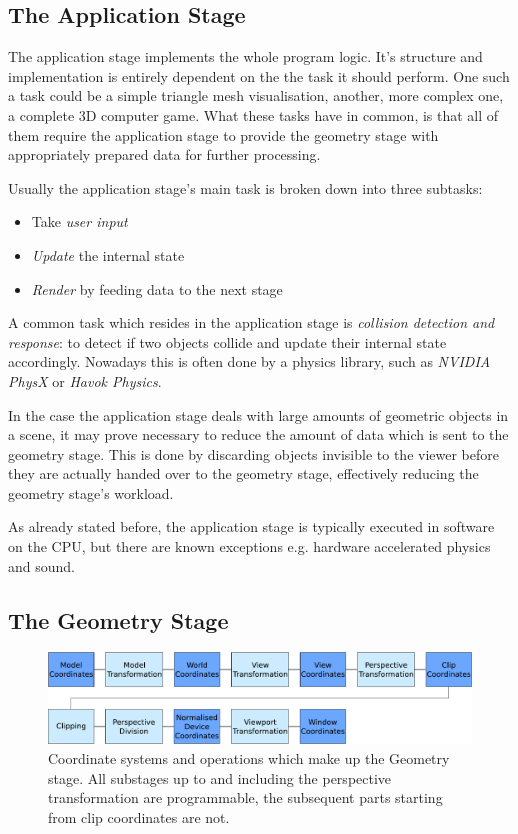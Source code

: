 \subsection{The Application Stage}
The application stage implements the whole program logic. It's structure and
implementation is entirely dependent on the the task it should perform. One
such a task could be a simple triangle mesh visualisation, another, more
complex one, a complete 3D computer game. What these tasks have in common, is
that all of them require the application stage to provide the geometry stage
with appropriately prepared data for further processing.

Usually the application stage's main task is broken down into three subtasks:
\begin{itemize}
 \item Take \textit{user input}
 \item \textit{Update} the internal state
 \item \textit{Render} by feeding data to the next stage
\end{itemize}

A common task which resides in the application stage is \textit{collision
detection and response}: to detect if two objects collide and update their
internal state accordingly. Nowadays this is often done by a physics library,
such as \textit{NVIDIA PhysX}\cite{misc:ageia-physx} or \textit{Havok
Physics}\cite{misc:havok}.

In the case the application stage deals with large amounts of geometric
objects in a scene, it may prove necessary to reduce the amount of data which
is sent to the geometry stage. This is done by discarding objects invisible to
the viewer before they are actually handed over to the geometry stage,
effectively reducing the geometry stage's workload.

As already stated before, the application stage is typically executed in
software on the CPU, but there are known exceptions e.g. hardware accelerated
physics and sound.

\subsection{The Geometry Stage}
\begin{figure}
\begin{center}
\includegraphics[scale=0.5]{Images/Geometry-Stage.pdf}
\caption[The Geometry Stage]{Coordinate systems and operations which make up the
Geometry stage. All substages up to and including the perspective transformation
are programmable, the subsequent parts starting from clip coordinates are not.}
\label{fig:GeometryStage}
\end{center}
\end{figure}

